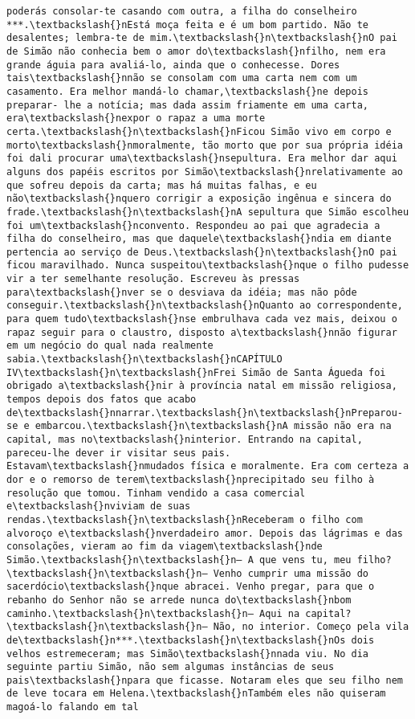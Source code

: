 \begin{Verbatim}[commandchars=\\\{\}]
poderás consolar-te casando com outra, a filha do conselheiro ***.\textbackslash{}nEstá moça feita e é um bom partido. Não te desalentes; lembra-te de mim.\textbackslash{}n\textbackslash{}nO pai de Simão não conhecia bem o amor do\textbackslash{}nfilho, nem era grande águia para avaliá-lo, ainda que o conhecesse. Dores tais\textbackslash{}nnão se consolam com uma carta nem com um casamento. Era melhor mandá-lo chamar,\textbackslash{}ne depois preparar- lhe a notícia; mas dada assim friamente em uma carta, era\textbackslash{}nexpor o rapaz a uma morte certa.\textbackslash{}n\textbackslash{}nFicou Simão vivo em corpo e morto\textbackslash{}nmoralmente, tão morto que por sua própria idéia foi dali procurar uma\textbackslash{}nsepultura. Era melhor dar aqui alguns dos papéis escritos por Simão\textbackslash{}nrelativamente ao que sofreu depois da carta; mas há muitas falhas, e eu não\textbackslash{}nquero corrigir a exposição ingênua e sincera do frade.\textbackslash{}n\textbackslash{}nA sepultura que Simão escolheu foi um\textbackslash{}nconvento. Respondeu ao pai que agradecia a filha do conselheiro, mas que daquele\textbackslash{}ndia em diante pertencia ao serviço de Deus.\textbackslash{}n\textbackslash{}nO pai ficou maravilhado. Nunca suspeitou\textbackslash{}nque o filho pudesse vir a ter semelhante resolução. Escreveu às pressas para\textbackslash{}nver se o desviava da idéia; mas não pôde conseguir.\textbackslash{}n\textbackslash{}nQuanto ao correspondente, para quem tudo\textbackslash{}nse embrulhava cada vez mais, deixou o rapaz seguir para o claustro, disposto a\textbackslash{}nnão figurar em um negócio do qual nada realmente sabia.\textbackslash{}n\textbackslash{}nCAPÍTULO IV\textbackslash{}n\textbackslash{}nFrei Simão de Santa Águeda foi obrigado a\textbackslash{}nir à província natal em missão religiosa, tempos depois dos fatos que acabo de\textbackslash{}nnarrar.\textbackslash{}n\textbackslash{}nPreparou-se e embarcou.\textbackslash{}n\textbackslash{}nA missão não era na capital, mas no\textbackslash{}ninterior. Entrando na capital, pareceu-lhe dever ir visitar seus pais. Estavam\textbackslash{}nmudados física e moralmente. Era com certeza a dor e o remorso de terem\textbackslash{}nprecipitado seu filho à resolução que tomou. Tinham vendido a casa comercial e\textbackslash{}nviviam de suas rendas.\textbackslash{}n\textbackslash{}nReceberam o filho com alvoroço e\textbackslash{}nverdadeiro amor. Depois das lágrimas e das consolações, vieram ao fim da viagem\textbackslash{}nde Simão.\textbackslash{}n\textbackslash{}n— A que vens tu, meu filho?\textbackslash{}n\textbackslash{}n— Venho cumprir uma missão do sacerdócio\textbackslash{}nque abracei. Venho pregar, para que o rebanho do Senhor não se arrede nunca do\textbackslash{}nbom caminho.\textbackslash{}n\textbackslash{}n— Aqui na capital?\textbackslash{}n\textbackslash{}n— Não, no interior. Começo pela vila de\textbackslash{}n***.\textbackslash{}n\textbackslash{}nOs dois velhos estremeceram; mas Simão\textbackslash{}nnada viu. No dia seguinte partiu Simão, não sem algumas instâncias de seus pais\textbackslash{}npara que ficasse. Notaram eles que seu filho nem de leve tocara em Helena.\textbackslash{}nTambém eles não quiseram magoá-lo falando em tal 
\end{Verbatim}
